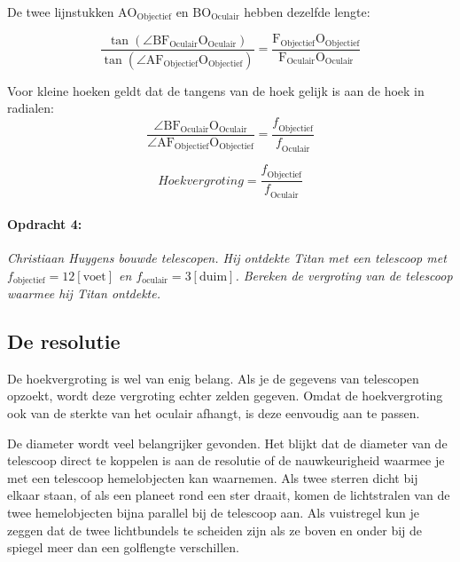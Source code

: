 De twee lijnstukken $\mathrm{A}\mathrm{O_{Objectief}}$ en $\mathrm{B}\mathrm{O_{Oculair}}$
hebben dezelfde lengte:

\begin{equation}
\frac{\tan(\angle\mathrm{B}\mathrm{F_{Oculair}O_{Oculair}})}{\tan(\angle\mathrm{A}\mathrm{F_{Objectief}O_{Objectief}})}
=\frac{\mathrm{F_{Objectief}O_{Objectief}}}{\mathrm{F_{Oculair}O_{Oculair}}}
\end{equation}


Voor kleine hoeken geldt dat de tangens van de hoek gelijk is aan
de hoek in radialen:
\begin{equation}
\frac{\angle\mathrm{B}\mathrm{F_{Oculair}O_{Oculair}}}{\angle\mathrm{A}\mathrm{F_{Objectief}O_{Objectief}}}
=\frac{\mathrm{\mathit{f}_{Objectief}}}{\mathrm{\mathit{f}_{Oculair}}}
\end{equation}


\begin{equation}
Hoekvergroting=\frac{\mathrm{\mathit{f}_{Objectief}}}{\mathrm{\mathit{f}_{Oculair}}}
\end{equation}


\paragraph*{Opdracht 4:}

\emph{Christiaan Huygens bouwde telescopen. Hij ontdekte Titan met een
telescoop met $f_{\mathrm{objectief}}=12[\mathrm{voet}]$ en
$f_{\mathrm{oculair}}=3[\mathrm{duim}]$. Bereken de vergroting van de
telescoop waarmee hij Titan ontdekte.}


\subsection{De resolutie}

De hoekvergroting is wel van enig belang. Als je de gegevens van telescopen
opzoekt, wordt deze vergroting echter zelden gegeven. Omdat de hoekvergroting
ook van de sterkte van het oculair afhangt, is deze eenvoudig aan
te passen.

De diameter wordt veel belangrijker gevonden. Het blijkt dat de diameter
van de telescoop direct te koppelen is aan de resolutie of de nauwkeurigheid
waarmee je met een telescoop hemelobjecten kan waarnemen. Als twee
sterren dicht bij elkaar staan, of als een planeet rond een ster draait,
komen de lichtstralen van de twee hemelobjecten bijna parallel bij
de telescoop aan. Als vuistregel kun je zeggen dat de twee lichtbundels
te scheiden zijn als ze boven en onder bij de spiegel meer dan een
golflengte verschillen.

